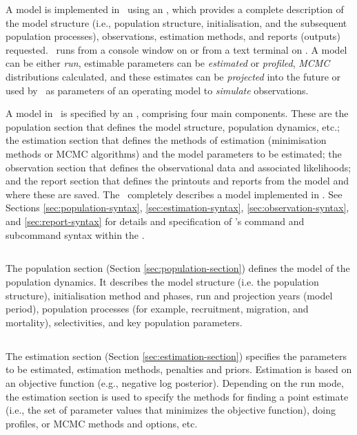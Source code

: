 A model is implemented in \CNAME\ using an \config {}, which provides a complete description of the model structure (i.e., population structure, initialisation, and the subsequent population processes), observations, estimation methods, and reports (outputs) requested. \CNAME\ runs from a console window on  or from a text terminal on . A model can be either \emph{run}, estimable parameters can be \emph{estimated} or \emph{profiled}, \emph{MCMC} distributions calculated, and these estimates can be \emph{projected} into the future or used by \CNAME\ as parameters of an operating model to \emph{simulate} observations.

A model in \CNAME\ is specified by an \config, comprising four main components. These are the population section that defines the model structure, population dynamics, etc.; the estimation section that defines the methods of estimation (minimisation methods or MCMC algorithms) and the model parameters to be estimated; the observation section that defines the observational data and associated likelihoods; and the report section that defines the printouts and reports from the model and where these are saved. The \config\ completely describes a model implemented in \CNAME. See Sections \ref{sec:population-syntax}, \ref{sec:estimation-syntax}, \ref{sec:observation-syntax}, and \ref{sec:report-syntax} for details and specification of \CNAME 's command and subcommand syntax within the \config.

\subsection{}

The population section (Section \ref{sec:population-section}) defines the model of the population dynamics. It describes the model structure (i.e. the population structure), initialisation method and phases, run and projection years (model period), population processes (for example, recruitment, migration, and mortality), selectivities, and key population parameters.

\subsection{}

The estimation section (Section \ref{sec:estimation-section}) specifies the parameters to be estimated, estimation methods, penalties and priors. Estimation is based on an objective function (e.g., negative log posterior). Depending on the run mode, the estimation section is used to specify the methods for finding a point estimate (i.e., the set of parameter values that minimizes the objective function), doing profiles, or MCMC methods and options, etc.

